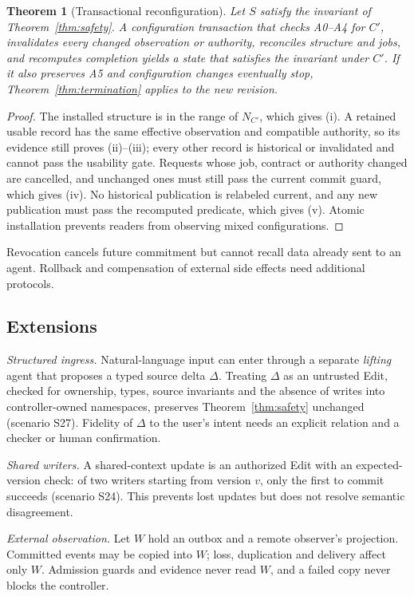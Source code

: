 \documentclass[10pt,journal,compsoc]{IEEEtran}
\theoremstyle{plain}
\newtheorem{theorem}{Theorem}
\theoremstyle{definition}
\begin{document}
\begin{theorem}[Transactional reconfiguration]\label{thm:reconfig}
Let $S$ satisfy the invariant of Theorem~\ref{thm:safety}. A configuration transaction that checks A0--A4 for $C'$, invalidates every changed observation or authority, reconciles structure and jobs, and recomputes completion yields a state that satisfies the invariant under $C'$. If it also preserves A5 and configuration changes eventually stop, Theorem~\ref{thm:termination} applies to the new revision.
\end{theorem}
\begin{proof}
The installed structure is in the range of $N_{C'}$, which gives (i). A retained usable record has the same effective observation and compatible authority, so its evidence still proves (ii)--(iii); every other record is historical or invalidated and cannot pass the usability gate. Requests whose job, contract or authority changed are cancelled, and unchanged ones must still pass the current commit guard, which gives (iv). No historical publication is relabeled current, and any new publication must pass the recomputed predicate, which gives (v). Atomic installation prevents readers from observing mixed configurations.
\end{proof}

Revocation cancels future commitment but cannot recall data already sent to an agent. Rollback and compensation of external side effects need additional protocols.

\subsection{Extensions}\label{sec:extensions}
\emph{Structured ingress.} Natural-language input can enter through a separate \emph{lifting} agent that proposes a typed source delta $\Delta$. Treating $\Delta$ as an untrusted Edit, checked for ownership, types, source invariants and the absence of writes into controller-owned namespaces, preserves Theorem~\ref{thm:safety} unchanged (scenario S27). Fidelity of $\Delta$ to the user's intent needs an explicit relation and a checker or human confirmation.

\emph{Shared writers.} A shared-context update is an authorized Edit with an expected-version check: of two writers starting from version $v$, only the first to commit succeeds (scenario S24). This prevents lost updates but does not resolve semantic disagreement.

\emph{External observation.} Let $W$ hold an outbox and a remote observer's projection. Committed events may be copied into $W$; loss, duplication and delivery affect only $W$. Admission guards and evidence never read $W$, and a failed copy never blocks the controller.
\end{document}
